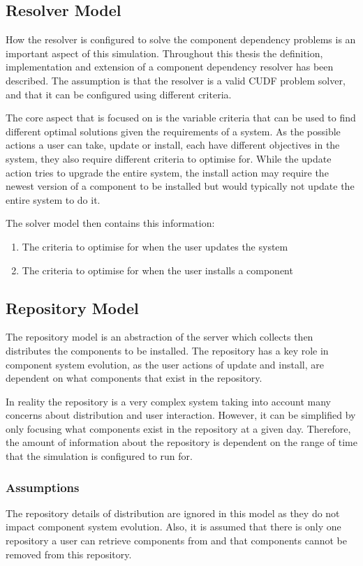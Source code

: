 \subsection{Resolver Model}
How the resolver is configured to solve the component dependency problems is an important aspect of this simulation.
Throughout this thesis the definition, implementation and extension of a component dependency resolver has been described.
The assumption is that the resolver is a valid CUDF problem solver, and that it can be configured using different criteria.

The core aspect that is focused on is the variable criteria that can be used to find different optimal solutions given the requirements of a system.
As the possible actions a user can take, update or install, each have different objectives in the system,
they also require different criteria to optimise for.
While the update action tries to upgrade the entire system, 
the install action may require the newest version of a component to be installed but would typically not update the entire system to do it. 

The solver model then contains this information:
\begin{enumerate}
  \item The criteria to optimise for when the user updates the system
  \item The criteria to optimise for when the user installs a component
\end{enumerate}

\subsection{Repository Model}
The repository model is an abstraction of the server which collects then distributes the components to be installed.
The repository has a key role in component system evolution, 
as the user actions of update and install, are dependent on what components that exist in the repository.

In reality the repository is a very complex system taking into account many concerns about distribution and user interaction.
However, it can be simplified by only focusing what components exist in the repository at a given day. 
Therefore, the amount of information about the repository is dependent on the range of time that the simulation is configured to run for.

\subsubsection{Assumptions}
The repository details of distribution are ignored in this model as they do not impact component system evolution.
Also, it is assumed that there is only one repository a user can retrieve components from and that components cannot be removed from this repository.

